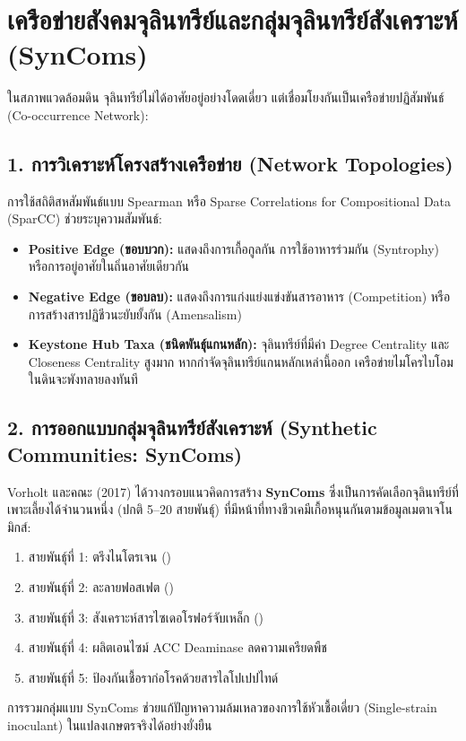 \section{เครือข่ายสังคมจุลินทรีย์และกลุ่มจุลินทรีย์สังเคราะห์ (SynComs)}

ในสภาพแวดล้อมดิน จุลินทรีย์ไม่ได้อาศัยอยู่อย่างโดดเดี่ยว แต่เชื่อมโยงกันเป็นเครือข่ายปฏิสัมพันธ์ (Co-occurrence Network):

\subsection{1. การวิเคราะห์โครงสร้างเครือข่าย (Network Topologies)}
การใช้สถิติสหสัมพันธ์แบบ Spearman หรือ Sparse Correlations for Compositional Data (SparCC) ช่วยระบุความสัมพันธ์:
\begin{itemize}
    \item \textbf{Positive Edge (ขอบบวก):} แสดงถึงการเกื้อกูลกัน การใช้อาหารร่วมกัน (Syntrophy) หรือการอยู่อาศัยในถิ่นอาศัยเดียวกัน
    \item \textbf{Negative Edge (ขอบลบ):} แสดงถึงการแก่งแย่งแข่งขันสารอาหาร (Competition) หรือการสร้างสารปฏิชีวนะยับยั้งกัน (Amensalism)
    \item \textbf{Keystone Hub Taxa (ชนิดพันธุ์แกนหลัก):} จุลินทรีย์ที่มีค่า Degree Centrality และ Closeness Centrality สูงมาก หากกำจัดจุลินทรีย์แกนหลักเหล่านี้ออก เครือข่ายไมโครไบโอมในดินจะพังทลายลงทันที
\end{itemize}

\subsection{2. การออกแบบกลุ่มจุลินทรีย์สังเคราะห์ (Synthetic Communities: SynComs)}
Vorholt และคณะ (2017) \cite{vorholt2017syncom} ได้วางกรอบแนวคิดการสร้าง \textbf{SynComs} ซึ่งเป็นการคัดเลือกจุลินทรีย์ที่เพาะเลี้ยงได้จำนวนหนึ่ง (ปกติ 5--20 สายพันธุ์) ที่มีหน้าที่ทางชีวเคมีเกื้อหนุนกันตามข้อมูลเมตาเจโนมิกส์:
\begin{enumerate}
    \item สายพันธุ์ที่ 1: ตรึงไนโตรเจน ()
    \item สายพันธุ์ที่ 2: ละลายฟอสเฟต ()
    \item สายพันธุ์ที่ 3: สังเคราะห์สารไซเดอโรฟอร์จับเหล็ก ()
    \item สายพันธุ์ที่ 4: ผลิตเอนไซม์ ACC Deaminase ลดความเครียดพืช
    \item สายพันธุ์ที่ 5: ป้องกันเชื้อราก่อโรคด้วยสารไลโปเปปไทด์
\end{enumerate}
การรวมกลุ่มแบบ SynComs ช่วยแก้ปัญหาความล้มเหลวของการใช้หัวเชื้อเดี่ยว (Single-strain inoculant) ในแปลงเกษตรจริงได้อย่างยั่งยืน

